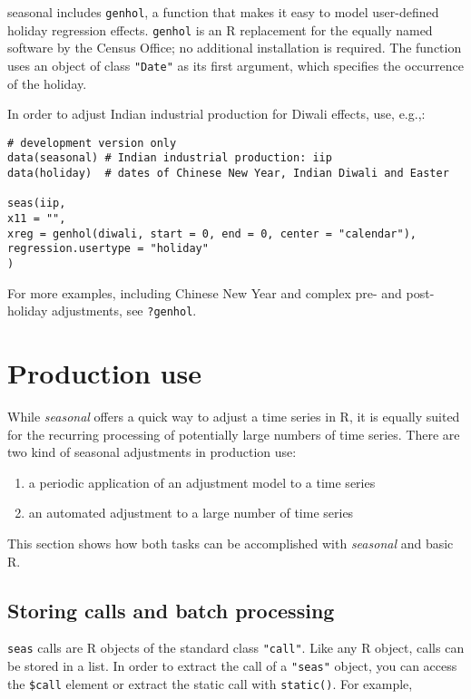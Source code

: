 seasonal includes \texttt{genhol}, a function that makes it easy to
model user-defined holiday regression effects. \texttt{genhol} is an R
replacement for the equally named software by the Census Office; no
additional installation is required. The function uses an object of
class \texttt{"Date"} as its first argument, which specifies the
occurrence of the holiday.

In order to adjust Indian industrial production for Diwali effects, use,
e.g.,:

\begin{verbatim}
# development version only
data(seasonal) # Indian industrial production: iip
data(holiday)  # dates of Chinese New Year, Indian Diwali and Easter

seas(iip, 
x11 = "",
xreg = genhol(diwali, start = 0, end = 0, center = "calendar"), 
regression.usertype = "holiday"
)
\end{verbatim}

For more examples, including Chinese New Year and complex pre- and
post-holiday adjustments, see \texttt{?genhol}.

\section{Production use}\label{production-use}

While \emph{seasonal} offers a quick way to adjust a time series in R,
it is equally suited for the recurring processing of potentially large
numbers of time series. There are two kind of seasonal adjustments in
production use:

\begin{enumerate}
\def\labelenumi{\arabic{enumi}.}
\itemsep1pt\parskip0pt
\item
  a periodic application of an adjustment model to a time series
\item
  an automated adjustment to a large number of time series
\end{enumerate}

This section shows how both tasks can be accomplished with
\emph{seasonal} and basic R.

\subsection{Storing calls and batch
processing}\label{storing-calls-and-batch-processing}

\texttt{seas} calls are R objects of the standard class \texttt{"call"}.
Like any R object, calls can be stored in a list. In order to extract
the call of a \texttt{"seas"} object, you can access the \texttt{\$call}
element or extract the static call with \texttt{static()}. For example,

